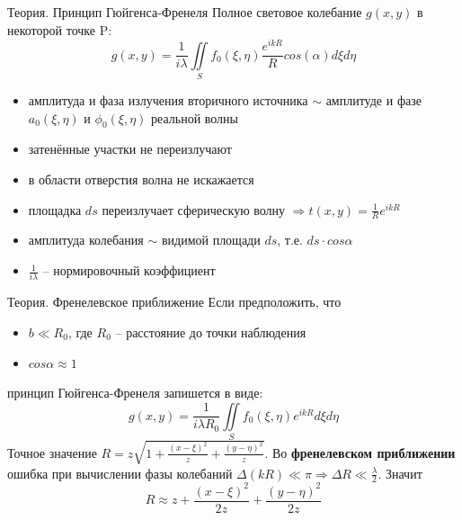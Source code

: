 \documentclass[11pt]{beamer} %
\begin{document}
    \begin{frame}{Теория. Принцип Гюйгенса-Френеля}    
            Полное световое колебание $g(x,y)$ в некоторой точке P:
            \begin{equation}
                g(x,y) = \frac{1}{i\lambda}\iint\limits_{S}f_0(\xi,\eta)\frac{e^{ikR}}{R}cos(\alpha) d\xi d\eta
            \end{equation}
            \begin{itemize}
                \item амплитуда и фаза излучения вторичного источника $\sim$ амплитуде и фазе $a_0(\xi, \eta)$ и $\phi_0(\xi, \eta)$ реальной волны
                \item затенённые участки не переизлучают
                \item в области отверстия волна не искажается
                \item площадка $ds$ переизлучает сферическую волну $\Rightarrow t(x,y) = \frac{1}{R}e^{ikR}$
                \item амплитуда колебания $\sim$ видимой площади $ds$, т.е. $ds \cdot cos\alpha$
                \item $\frac{1}{i\lambda}$ -- нормировочный коэффициент
            \end{itemize}
    \end{frame}

    \begin{frame}{Теория. Френелевское приближение}
        Если предположить, что
        \begin{itemize}
            \item $b \ll R_0$, где $R_0$ -- расстояние до точки наблюдения
            \item $cos\alpha \approx 1$
        \end{itemize}
        принцип Гюйгенса-Френеля запишется в виде:
        \begin{equation}
            g(x,y) = \frac{1}{i\lambda R_0}\iint\limits_{S}f_0(\xi,\eta)e^{ikR}d\xi d\eta
        \end{equation}
        Точное значение $R = z\sqrt{1 + \frac{(x-\xi)^2}{z} + \frac{(y-\eta)^2}{z}}$. Во \textbf{френелевском приближении} ошибка при вычислении фазы колебаний $\Delta(kR) \ll \pi \Rightarrow \Delta R \ll \frac{\lambda}{2}$. Значит 
        \begin{equation}
            R \approx z + \frac{(x-\xi)^2}{2z} + \frac{(y-\eta)^2}{2z}
        \end{equation}
         
    \end{frame}
\end{document}
